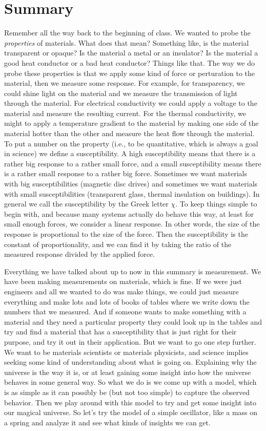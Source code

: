 \documentclass[]{revtex4}
\begin{document}
\section*{Summary}

Remember all the way back to the beginning of class.  We wanted to probe the {\it
    properties} of materials.  What does that mean? Something like, is the material transparent
or opaque?  Is the material a metal or an insulator?  Is the material a good heat conductor
or a bad heat conductor? Things like that.  The way we do probe these properties is that we
apply some kind of force or perturation to the material, then we measure some response. For
example, for transparency, we could shine light on the material and we measure the
transmission of light through the material.  For electrical conductivity we could apply a
voltage to the material and measure the resulting current.  For the thermal conductivity, we
might to apply a temperature gradient to the material by making one side of the material
hotter than the other and measure the heat flow through the material.  To put a number on
the property (i.e., to be quantitative, which is always a goal in science) we define a
susceptibility.  A high susceptibility means that there is a rather big response to a rather
small force, and a small susceptibility means there is a rather small response to a rather
big force.  Sometimes we want materials with big susceptibilities (magnetic disc drives) and
sometimes we want materials with small susceptibilities (transparent glass, thermal
insulation on buildings).  In general we call the susceptibility by the Greek letter $\chi$.
To keep things simple to begin with, and because many systems actually do behave this way,
at least for small enough forces, we consider a linear response.  In other words, the size
of the response is proportional to the size of the force.  Then the susceptibility is the
constant of proportionality, and we can find it by taking the ratio of the measured response
divided by the applied force.

Everything we have talked about up to now in this summary is measurement.  We have been
making measurements on materials, which is fine.  If we were just engineers and all we
wanted to do was make things, we could just measure everything and make lots and lots of
books of tables where we write down the numbers that we measured.  And if someone wants to
make something with a material and they need a particular property they could look up in the
tables and try and find a material that has a susceptibility that is just right for their
purpose, and try it out in their application.  But we want to go one step further.  We want
to be materials scientists or materials physicists, and science implies seeking some kind of
understanding about what is going on. Explaining why the universe is the way it is, or at
least gaining some insight into how the universe behaves in some general way.  So what we do
is we come up with a model, which is as simple as it can possibly be (but not too simple) to
capture the observed behavior.  Then we play around with this model to try and get some
insight into our magical universe.  So let's try the model of a simple oscillator, like a
mass on a spring and analyze it and see what kinds of insights we can get.
\end{document}
